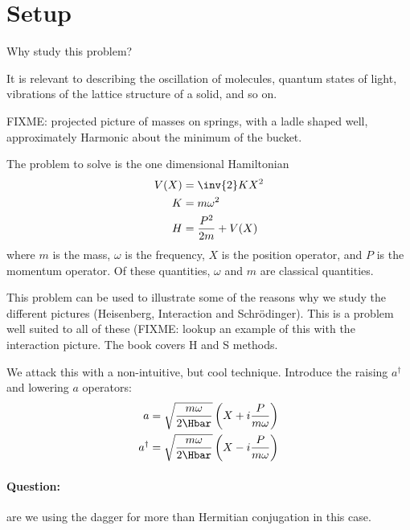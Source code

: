 %
%
%
\section{Setup}
Why study this problem?

It is relevant to describing the oscillation of molecules, quantum states of light, vibrations of the lattice structure of a solid, and so on.

FIXME: projected picture of masses on springs, with a ladle shaped well, approximately Harmonic about the minimum of the bucket.

The problem to solve is the one dimensional Hamiltonian
%
\begin{equation}\label{eqn:PHY356FLecture11:10}
\begin{aligned}
V(X) &= \inv{2} K X^2 \\
K &= m \omega^2 \\
H &= \frac{P^2}{2m} + V(X)
\end{aligned}
\end{equation}
%
where \(m\) is the mass, \(\omega\) is the frequency, \(X\) is the position operator, and \(P\) is the momentum operator.  Of these quantities, \(\omega\) and \(m\) are classical quantities.

This problem can be used to illustrate some of the reasons why we study the different pictures (Heisenberg, Interaction and Schr\"{o}dinger).  This is a problem well suited to all of these (FIXME: lookup an example of this with the interaction picture.  The book covers H and S methods.

We attack this with a non-intuitive, but cool technique.  Introduce the raising \(a^\dagger\) and lowering \(a\) operators:
%
\begin{equation}\label{eqn:PHY356FLecture11:20}
\begin{aligned}
a &= \sqrt{\frac{m \omega}{2 \Hbar}} \left( X + i \frac{P}{m\omega} \right) \\
a^\dagger &= \sqrt{\frac{m \omega}{2 \Hbar}} \left( X - i \frac{P}{m\omega} \right)
\end{aligned}
\end{equation}
%
\paragraph{Question:} are we using the dagger for more than Hermitian conjugation in this case.
